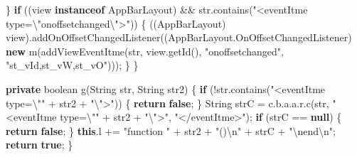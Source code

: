 \documentclass[
]{article}
\newenvironment{Shaded}{}{}
\newcommand{\BuiltInTok}[1]{\textcolor[rgb]{0.00,0.50,0.00}{#1}}
\newcommand{\ControlFlowTok}[1]{\textcolor[rgb]{0.00,0.44,0.13}{\textbf{#1}}}
\newcommand{\DataTypeTok}[1]{\textcolor[rgb]{0.56,0.13,0.00}{#1}}
\newcommand{\FunctionTok}[1]{\textcolor[rgb]{0.02,0.16,0.49}{#1}}
\newcommand{\KeywordTok}[1]{\textcolor[rgb]{0.00,0.44,0.13}{\textbf{#1}}}
\newcommand{\NormalTok}[1]{#1}
\newcommand{\OperatorTok}[1]{\textcolor[rgb]{0.40,0.40,0.40}{#1}}
\newcommand{\SpecialCharTok}[1]{\textcolor[rgb]{0.25,0.44,0.63}{#1}}
\newcommand{\StringTok}[1]{\textcolor[rgb]{0.25,0.44,0.63}{#1}}
\begin{document}
\begin{Shaded}
\begin{Highlighting}[]
        \OperatorTok{\}}
        \ControlFlowTok{if} \OperatorTok{((}\NormalTok{view }\KeywordTok{instanceof}\NormalTok{ AppBarLayout}\OperatorTok{)} \OperatorTok{\&\&}\NormalTok{ str}\OperatorTok{.}\FunctionTok{contains}\OperatorTok{(}\StringTok{"\textless{}eventItme type=}\SpecialCharTok{\textbackslash{}"}\StringTok{onoffsetchanged}\SpecialCharTok{\textbackslash{}"}\StringTok{\textgreater{}"}\OperatorTok{))} \OperatorTok{\{}
            \OperatorTok{((}\NormalTok{AppBarLayout}\OperatorTok{)}\NormalTok{ view}\OperatorTok{).}\FunctionTok{addOnOffsetChangedListener}\OperatorTok{((}\NormalTok{AppBarLayout}\OperatorTok{.}\FunctionTok{OnOffsetChangedListener}\OperatorTok{)} \KeywordTok{new} \FunctionTok{m}\OperatorTok{(}\FunctionTok{addViewEventItme}\OperatorTok{(}\NormalTok{str}\OperatorTok{,}\NormalTok{ view}\OperatorTok{.}\FunctionTok{getId}\OperatorTok{(),} \StringTok{"onoffsetchanged"}\OperatorTok{,} \StringTok{"st\_vId,st\_vW,st\_vO"}\OperatorTok{)));}
        \OperatorTok{\}}
    \OperatorTok{\}}

    \KeywordTok{private} \DataTypeTok{boolean} \FunctionTok{g}\OperatorTok{(}\BuiltInTok{String}\NormalTok{ str}\OperatorTok{,} \BuiltInTok{String}\NormalTok{ str2}\OperatorTok{)} \OperatorTok{\{}
        \ControlFlowTok{if} \OperatorTok{(!}\NormalTok{str}\OperatorTok{.}\FunctionTok{contains}\OperatorTok{(}\StringTok{"\textless{}eventItme type=}\SpecialCharTok{\textbackslash{}"}\StringTok{"} \OperatorTok{+}\NormalTok{ str2 }\OperatorTok{+} \StringTok{"}\SpecialCharTok{\textbackslash{}"}\StringTok{\textgreater{}"}\OperatorTok{))} \OperatorTok{\{}
            \ControlFlowTok{return} \KeywordTok{false}\OperatorTok{;}
        \OperatorTok{\}}
        \BuiltInTok{String}\NormalTok{ strC }\OperatorTok{=}\NormalTok{ c}\OperatorTok{.}\FunctionTok{b}\OperatorTok{.}\FunctionTok{a}\OperatorTok{.}\FunctionTok{a}\OperatorTok{.}\FunctionTok{r}\OperatorTok{.}\FunctionTok{c}\OperatorTok{(}\NormalTok{str}\OperatorTok{,} \StringTok{"\textless{}eventItme type=}\SpecialCharTok{\textbackslash{}"}\StringTok{"} \OperatorTok{+}\NormalTok{ str2 }\OperatorTok{+} \StringTok{"}\SpecialCharTok{\textbackslash{}"}\StringTok{\textgreater{}"}\OperatorTok{,} \StringTok{"\textless{}/eventItme\textgreater{}"}\OperatorTok{);}
        \ControlFlowTok{if} \OperatorTok{(}\NormalTok{strC }\OperatorTok{==} \KeywordTok{null}\OperatorTok{)} \OperatorTok{\{}
            \ControlFlowTok{return} \KeywordTok{false}\OperatorTok{;}
        \OperatorTok{\}}
        \KeywordTok{this}\OperatorTok{.}\FunctionTok{l} \OperatorTok{+=} \StringTok{"function "} \OperatorTok{+}\NormalTok{ str2 }\OperatorTok{+} \StringTok{"()}\SpecialCharTok{\textbackslash{}n}\StringTok{"} \OperatorTok{+}\NormalTok{ strC }\OperatorTok{+} \StringTok{"}\SpecialCharTok{\textbackslash{}n}\StringTok{end}\SpecialCharTok{\textbackslash{}n}\StringTok{"}\OperatorTok{;}
        \ControlFlowTok{return} \KeywordTok{true}\OperatorTok{;}
    \OperatorTok{\}}


\end{Highlighting}
\end{Shaded}
\end{document}
